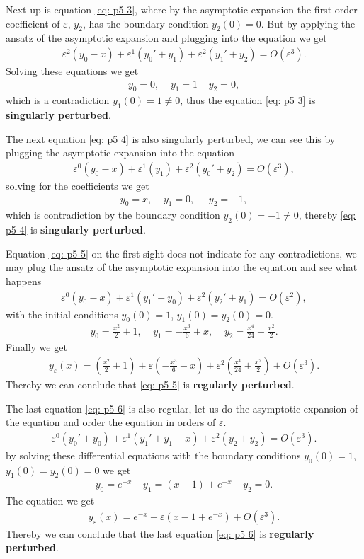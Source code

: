 \documentclass[a4paper]{article}
\newcommand{\eps}{\varepsilon}
\begin{document}
Next up is equation \ref{eq: p5 3}, where by the asymptotic expansion the
first order coefficient of $\eps$, $y_2$, has the boundary condition $y_2(0)
= 0$. But by applying the ansatz of the asymptotic expansion and plugging
into the equation we get
\begin{align}
    \eps^2(y_0 - x) + \eps^1 (y_0' + y_1) + \eps^2(y_1' + y_2) = O(\eps^3).
\end{align}
Solving these equations we get
\begin{align}
    y_0 = 0, \;\;\;\; y_1 = 1 \;\;\;\; y_2 = 0 ,
\end{align}
which is a contradiction $y_1(0) = 1 \neq 0 $, thus the equation \ref{eq: p5
3} is \textbf{singularly perturbed}.

The next equation \ref{eq: p5 4} is also singularly perturbed, we
can see this by plugging the asymptotic expansion into the equation
\begin{align}
 \eps^0 ( y_0 - x) + \eps^1(y_1) + \eps^2(y_0' + y_2) = O(\eps^3),
\end{align}
solving for the coefficients we get
\begin{align}
    y_0 = x, \;\;\;\; y_1 = 0, \;\;\;\;\; y_2 = -1,
\end{align}
which is contradiction by the boundary condition $y_2(0) = -1 \neq 0$,
thereby \ref{eq: p5 4} is \textbf{singularly perturbed}.

Equation \ref{eq: p5 5} on the first sight does not indicate for any
contradictions, we may plug the ansatz of the asymptotic expansion into the
equation and see what happens
\begin{align}
    \eps^0(y_0 -x) + \eps^1(y_1' + y_0) + \eps^2(y_2' +y_1) = O(\eps^2),
\end{align}
with the initial conditions $y_0(0) = 1$, $y_1(0) = y_2(0) = 0$.
\begin{align}
    y_0 = \frac{x^2}{2} + 1, \;\;\;\;
    y_1 = -\frac{x^3}{6} + x, \;\;\;\;
    y_2 = \frac{x^4}{24} + \frac{x^2}{2}.
\end{align}
Finally we get
\begin{align}
    y_\eps(x) = (\frac{x^2}{2}+1) + \eps(-\frac{x^3}{6} -x)
    +\eps^2(\frac{x^4}{24} + \frac{x^2}{2}) + O(\eps^3).
\end{align}
Thereby we can conclude that \ref{eq: p5 5} is \textbf{regularly perturbed}.

The last equation \ref{eq: p5 6} is also regular, let us do the asymptotic
expansion of the equation and order the equation in orders of $\eps$.
\begin{align}
    \eps^0(y_0' + y_0) + \eps^1(y_1' + y_1 -x) + \eps^2(y_2 + y_2) =
    O(\eps^3).
\end{align}
by solving these differential equations with the boundary conditions $y_0(0)
= 1$, $y_1(0) = y_2(0) = 0$ we get
\begin{align}
    y_0 =  e^{-x} \;\;\;\; y_1 = (x-1) + e^{-x} \;\;\;\; y_2 = 0.
\end{align}
The equation we get
\begin{align}
    y_\eps(x) = e^{-x} + \eps(x-1 +e^{-x}) + O(\eps^3).
\end{align}
Thereby we can conclude that the last equation \ref{eq: p5 6} is
\textbf{regularly perturbed}.
\end{document}
